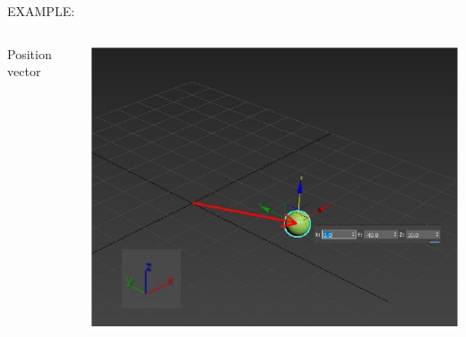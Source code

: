 \documentclass[]{beamer}
\begin{document}
\begin{frame}


  EXAMPLE:
  
  
  
  
  
  
  
  \begin{columns}
  
  Position vector
  
  
  
  \begin{center}
       \includegraphics[width=1.1\textwidth]{images/exampleVS2.jpg}      
       \end{center}
  
  
  \end{columns}
  
  
  
  
   \end{frame}
  
  
  
\end{document}

